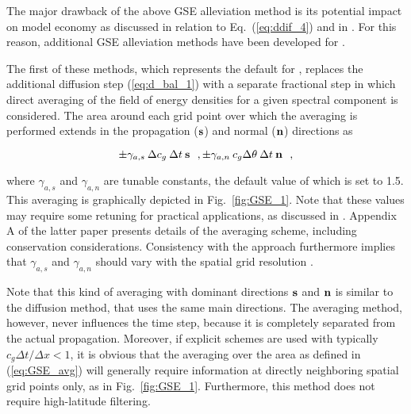 
\vspace{\baselineskip} 


\noindent
The major drawback of the above GSE alleviation method is its potential impact
on model economy as discussed in relation to Eq.~(\ref{eq:ddif_4}) and in
\cite{tol:Waves01a,tol:OMOD02b}. For this reason, additional GSE alleviation
methods have been developed for \ws.

The first of these methods, which represents the default for \ws, replaces the
additional diffusion step (\ref{eq:d_bal_1}) with a separate fractional step
in which direct averaging of the field of energy densities for a given
spectral component is considered. The area around each grid point over which
the averaging is performed extends in the propagation ($\mbox{\bf s}$) and normal
($\mbox{\bf n}$) directions as

\begin{equation}
\pm \gamma_{a,s} \: \Delta c_g \: \Delta t \: \mbox{\bf s} \:\:\: ,
\pm \gamma_{a,n} \: c_g \Delta \theta \: \Delta t \: \mbox{\bf n} \:\:\: , \label{eq:GSE_avg}
\end{equation}

\noindent
where $\gamma_{a,s}$ and $\gamma_{a,n}$ are tunable constants, the default
value of which is set to 1.5. This averaging is graphically depicted in
Fig.~\ref{fig:GSE_1}. Note that these values may require some retuning for
practical applications, as discussed in \cite{tol:OMOD02b}. Appendix A of the
latter paper presents details of the averaging scheme, including conservation
considerations. Consistency with the \cite{art:BH87} approach furthermore
implies that $\gamma_{a,s}$ and $\gamma_{a,n}$ should vary with the spatial
grid resolution \citep[see][Appendix]{tol:OMOD08a}.

Note that this kind of averaging with dominant directions $\mbox{\bf s}$ and $\mbox{\bf n}$ is
similar to the \cite{art:BH87} diffusion method, that uses the same main
directions. The averaging method, however, never influences the time step,
because it is completely separated from the actual propagation. Moreover, if
explicit schemes are used with typically $c_g \Delta t / \Delta x < 1$, it is
obvious that the averaging over the area as defined in (\ref{eq:GSE_avg}) will
generally require information at directly neighboring spatial grid points
only, as in Fig.~\ref{fig:GSE_1}. Furthermore, this method does not require
high-latitude filtering.

